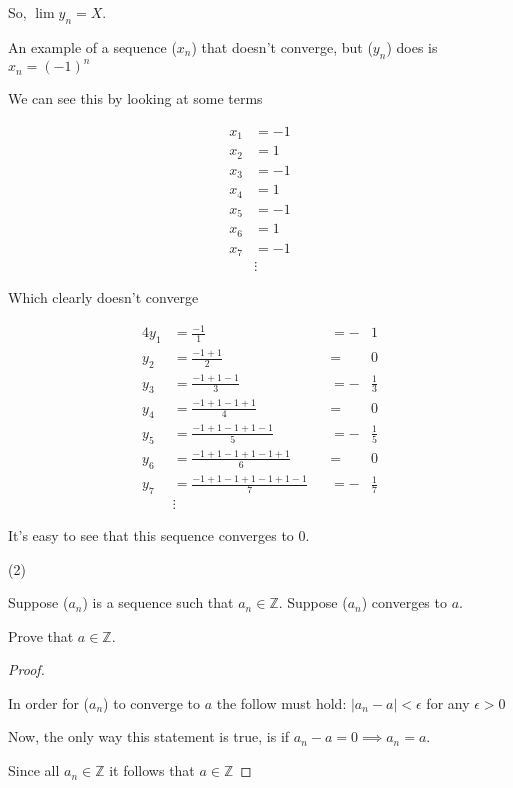 \documentclass[12pt,letterpaper]{article}
\begin{document}
\begin{enumerate}
      So, $\lim y_n = X$.


      An example of a sequence ($x_n$) that doesn't converge, but ($y_n$) does is
      $x_n = (-1)^n$

      We can see this by looking at some terms

      \begin{align*}
        x_1 &= -1 \\
        x_2 &= 1 \\
        x_3 &= -1 \\
        x_4 &= 1 \\
        x_5 &= -1 \\
        x_6 &= 1 \\
        x_7 &= -1 \\
        &\vdots
      \end{align*}

      Which clearly doesn't converge

      \begin{alignat*}{4}
        y_1 &= \frac{-1}{1} &&= -&1 \\
        y_2 &= \frac{-1 + 1}{2} &&= & 0 \\
        y_3 &= \frac{-1 + 1 - 1}{3} &&= -&\frac{1}{3} \\
        y_4 &= \frac{-1 + 1 - 1 + 1}{4} &&= & 0 \\
        y_5 &= \frac{-1 + 1 - 1 + 1 - 1}{5} &&= -&\frac{1}{5} \\
        y_6 &= \frac{-1 + 1 - 1 + 1 - 1 + 1}{6} &&= & 0 \\
        y_7 &= \frac{-1 + 1 - 1 + 1 - 1 + 1 - 1}{7} &&= -&\frac{1}{7} \\
        &\vdots
      \end{alignat*}

      It's easy to see that this sequence converges to $0$.
  \end{enumerate}

  \pagebreak
  (2)

  Suppose ($a_n$) is a sequence such that $a_n \in \mathbb{Z}$.
  Suppose ($a_n$) converges to $a$.

  Prove that $a \in \mathbb{Z}$.

  \begin{proof}\

    In order for ($a_n$) to converge to $a$ the follow must hold:
    $|a_n - a| < \epsilon$ for any $\epsilon > 0$

    Now, the only way this statement is true, is if
    $a_n - a = 0 \implies a_n = a$.

    Since all $a_n \in \mathbb{Z}$ it follows that $a \in \mathbb{Z}$
  \end{proof}
\end{document}
